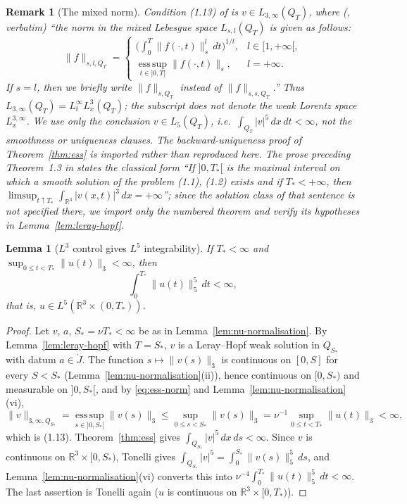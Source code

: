 \documentclass[11pt]{article}
\newtheorem{remark}[theorem]{Remark}
\newtheorem{lemma}[theorem]{Lemma}
\theoremstyle{definition}
\theoremstyle{plain}
\newcommand{\R}{\mathbb R}
\newcommand{\norm}[1]{\lVert #1\rVert}
\begin{document}
\begin{remark}[The mixed norm]\label{rem:ess-norm}
Condition (1.13) of \cite{ESS2003} is $v\in L_{3,\infty}(Q_T)$, where
(\cite[p.~213]{ESS2003}, verbatim) ``the norm in the mixed Lebesgue space
$L_{s,l}(Q_T)$ is given as follows:
\begin{equation}\label{eq:ess-norm}
 \norm f_{s,l,Q_T}=
 \begin{cases}
  \Big(\int_0^T\norm{f(\cdot,t)}_s^l\,dt\Big)^{1/l}, & l\in[1,+\infty[,\\[4pt]
  \operatorname*{ess\,sup}_{t\in]0,T[}\norm{f(\cdot,t)}_s, & l=+\infty .
 \end{cases}
\end{equation}
If $s=l$, then we briefly write $\norm f_{s,Q_T}$ instead of
$\norm f_{s,s,Q_T}$.''  Thus $L_{3,\infty}(Q_T)=L^\infty_tL^3_x(Q_T)$; the
subscript does not denote the weak Lorentz space $L^{3,\infty}_x$.  We use
only the conclusion $v\in L_5(Q_T)$, i.e.\ $\int_{Q_T}|v|^5\,dx\,dt<\infty$,
not the smoothness or uniqueness clauses.  The backward-uniqueness proof of
Theorem~\ref{thm:ess} is imported rather than reproduced here.  The prose
preceding Theorem~1.3 in \cite[p.~214]{ESS2003} states the classical form
``If $]0,T_*[$ is the maximal interval on which a smooth solution of the
problem (1.1), (1.2) exists and if $T_*<+\infty$, then
$\limsup_{t\uparrow T_*}\int_{\R^3}|v(x,t)|^3\,dx=+\infty$''; since the
solution class of that sentence is not specified there, we import only the
numbered theorem and verify its hypotheses in Lemma~\ref{lem:leray-hopf}.
\end{remark}

\begin{lemma}[$L^3$ control gives $L^5$ integrability]\label{lem:l3-to-l5}
If $T_*<\infty$ and $\sup_{0\leq t<T_*}\norm{u(t)}_3<\infty$, then
\[
 \int_0^{T_*}\norm{u(t)}_5^5\,dt<\infty ,
\]
that is, $u\in L^5(\R^3\times(0,T_*))$.
\end{lemma}

\begin{proof}
Let $v$, $a$, $S_*=\nu T_*<\infty$ be as in Lemma~\ref{lem:nu-normalisation}.
By Lemma~\ref{lem:leray-hopf} with $T=S_*$, $v$ is a Leray--Hopf weak solution
in $Q_{S_*}$ with datum $a\in\mathring J$.  The function $s\mapsto\norm{v(s)}_3$
is continuous on $[0,S]$ for every $S<S_*$ (Lemma~\ref{lem:nu-normalisation}(ii)),
hence continuous on $[0,S_*)$ and measurable on $]0,S_*[$, and by
\eqref{eq:ess-norm} and Lemma~\ref{lem:nu-normalisation}(vi),
\[
 \norm v_{3,\infty,Q_{S_*}}
 =\operatorname*{ess\,sup}_{s\in]0,S_*[}\norm{v(s)}_3
 \leq\sup_{0\leq s<S_*}\norm{v(s)}_3
 =\nu^{-1}\sup_{0\leq t<T_*}\norm{u(t)}_3<\infty ,
\]
which is (1.13).  Theorem~\ref{thm:ess} gives $\int_{Q_{S_*}}|v|^5\,dx\,ds<\infty$.
Since $v$ is continuous on $\R^3\times[0,S_*)$, Tonelli gives
$\int_{Q_{S_*}}|v|^5=\int_0^{S_*}\norm{v(s)}_5^5\,ds$, and
Lemma~\ref{lem:nu-normalisation}(vi) converts this into
$\nu^{-4}\int_0^{T_*}\norm{u(t)}_5^5\,dt<\infty$.  The last assertion is
Tonelli again ($u$ is continuous on $\R^3\times[0,T_*)$).
\end{proof}
\end{document}
